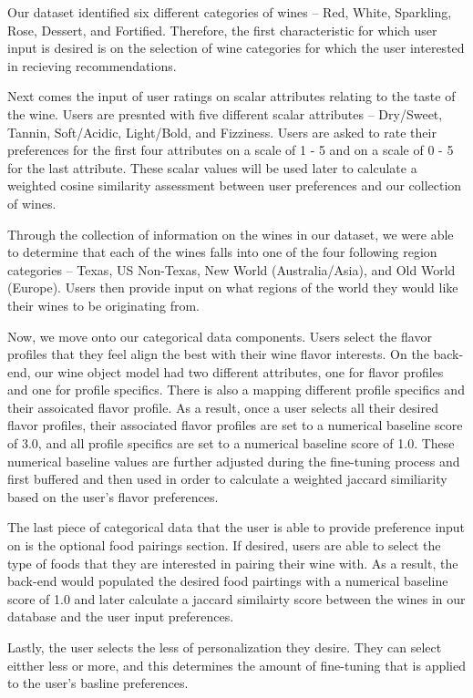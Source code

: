 \documentclass{article} %
\begin{document}
Our dataset identified six different categories of wines -- Red, White, Sparkling, Rose, Dessert, and Fortified. Therefore, the first characteristic for which user input is desired is on the selection of wine categories for which the user interested in recieving recommendations.  

Next comes the input of user ratings on scalar attributes relating to the taste of the wine. Users are presnted with five different scalar attributes -- Dry/Sweet, Tannin, Soft/Acidic, Light/Bold, and Fizziness. Users are asked to rate their preferences for the first four attributes on a scale of 1 - 5 and on a scale of 0 - 5 for the last attribute. These scalar values will be used later to calculate a weighted cosine similarity assessment between user preferences and our collection of wines.

Through the collection of information on the wines in our dataset, we were able to determine that each of the wines falls into one of the four following region categories -- Texas, US Non-Texas, New World (Australia/Asia), and Old World (Europe). Users then provide input on what regions of the world they would like their wines to be originating from. 

Now, we move onto our categorical data components. Users select the flavor profiles that they feel align the best with their wine flavor interests. On the back-end, our wine object model had two different attributes, one for flavor profiles and one for profile specifics. There is also a mapping different profile specifics and their assoicated flavor profile. As a result, once a user selects all their desired flavor profiles, their associated flavor profiles are set to a numerical baseline score of 3.0, and all profile specifics are set to a numerical baseline score of 1.0. These numerical baseline values are further adjusted during the fine-tuning process and first buffered and then used in order to calculate a weighted jaccard similiarity based on the user's flavor preferences. 

The last piece of categorical data that the user is able to provide preference input on is the optional food pairings section. If desired, users are able to select the type of foods that they are interested in pairing their wine with. As a result, the back-end would populated the desired food pairtings with a numerical baseline score of 1.0 and later calculate a jaccard similairty score between the wines in our database and the user input preferences. 

Lastly, the user selects the less of personalization they desire. They can select eitther less or more, and this determines the amount of fine-tuning that is applied to the user's basline preferences.
\end{document}
